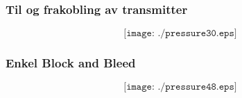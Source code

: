\documentclass[aspectratio=169,xcolor=dvipsnames]{beamer}
\begin{document}
%
%
\begin{frame}
	\frametitle{Til og frakobling av transmitter }

	$$\texttt{[image: ./pressure30.eps]}$$
\end{frame}
%
%
%
%
\begin{frame}
	\frametitle{Enkel Block and Bleed}

	$$\texttt{[image: ./pressure48.eps]}$$
\end{frame}
%
\end{document}
